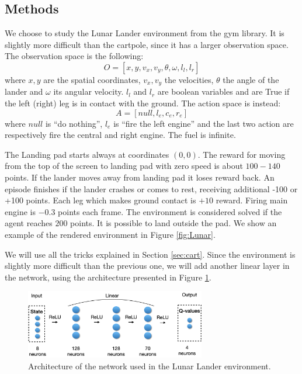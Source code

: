 \subsection{Methods}
We choose to study the Lunar Lander environment from the gym library. It is slightly more difficult than the cartpole, since it has a larger 
observation space.
The observation space is the following:
$$
O = [x, y, v_x, v_y, \theta, \omega, l_l, l_r]
$$
where $x, y$ are the spatial coordinates, $v_x, v_y$ the velocities, $\theta$ the angle of the lander and $\omega$ its angular velocity. $l_l$
and $l_r$ are boolean variables and are True if the left (right) leg is in contact with the ground. The action space is instead:
$$
A = [null, l_e, c_e, r_e]
$$ 
where $null$ is “do nothing”, $l_e$ is “fire the left engine” and the last two action are respectively fire the central and right engine. The 
fuel is infinite.

The Landing pad starts always at coordinates $(0,0)$. The reward for moving from the top of the screen to landing pad with zero speed is about 
$100-140$ points. If the lander moves away from landing pad it loses reward back. An episode finishes 
if the lander crashes or comes to rest, receiving additional -100 or +100 points. Each leg which makes ground contact is $+10$ reward. 
Firing main engine is $-0.3$ points each frame. The environment is considered solved if the agent reaches $200$ points. 
It is possible to land outside the pad. We show an example of the rendered environment in Figure \ref{fig:Lunar}.

We will use all the tricks explained in Section \ref{sec:cart}.
Since the environment is slightly more difficult than the previous one, we will add another linear layer in the network, using the architecture 
presented in Figure \ref{fig:lun_arc}.
\begin{figure}
    \centering
    \includegraphics[width=0.7\textwidth]{Images/LunarLandNet.png}
    \caption{Architecture of the network used in the Lunar Lander environment.}
    \label{fig:lun_arc}
\end{figure}


